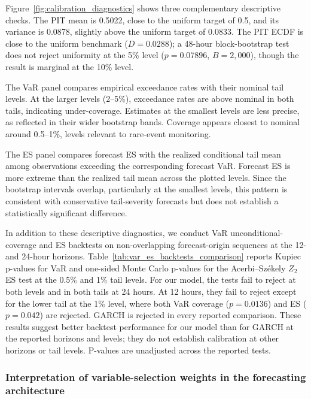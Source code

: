\documentclass[a4paper,fleqn]{cas-sc}
\begin{document}
Figure~\ref{fig:calibration_diagnostics} shows three complementary descriptive checks. The PIT mean is 0.5022, close to the uniform target of 0.5, and its variance is 0.0878, slightly above the uniform target of 0.0833. The PIT ECDF is close to the uniform benchmark ($D=0.0288$); a 48-hour block-bootstrap test does not reject uniformity at the 5\% level ($p=0.07896$, $B=2{,}000$), though the result is marginal at the 10\% level.

The VaR panel compares empirical exceedance rates with their nominal tail levels. At the larger levels (2--5\%), exceedance rates are above nominal in both tails, indicating under-coverage. Estimates at the smallest levels are less precise, as reflected in their wider bootstrap bands. Coverage appears closest to nominal around 0.5--1\%, levels relevant to rare-event monitoring.

The ES panel compares forecast ES with the realized conditional tail mean among observations exceeding the corresponding forecast VaR. Forecast ES is more extreme than the realized tail mean across the plotted levels. Since the bootstrap intervals overlap, particularly at the smallest levels, this pattern is consistent with conservative tail-severity forecasts but does not establish a statistically significant difference.

In addition to these descriptive diagnostics, we conduct VaR unconditional-coverage and ES backtests on non-overlapping forecast-origin sequences at the 12- and 24-hour horizons. Table~\ref{tab:var_es_backtests_comparison} reports Kupiec p-values for VaR and one-sided Monte Carlo p-values for the Acerbi--Székely $Z_2$ ES test at the 0.5\% and 1\% tail levels. For our model, the tests fail to reject at both levels and in both tails at 24 hours. At 12 hours, they fail to reject except for the lower tail at the 1\% level, where both VaR coverage ($p=0.0136$) and ES ($p=0.042$) are rejected. GARCH is rejected in every reported comparison. These results suggest better backtest performance for our model than for GARCH at the reported horizons and levels; they do not establish calibration at other horizons or tail levels. P-values are unadjusted across the reported tests.

\subsubsection{Interpretation of variable-selection weights in the forecasting architecture}
\end{document}
